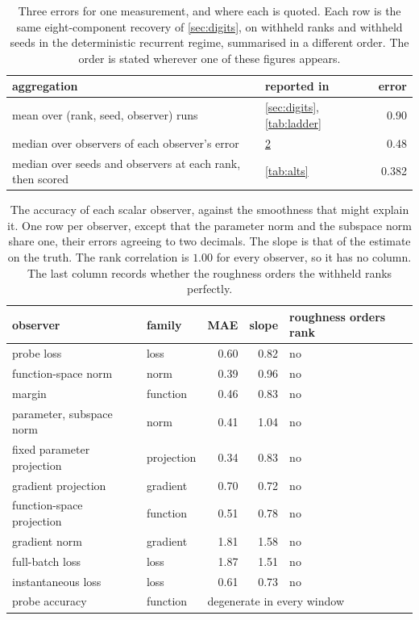 \documentclass{article}
\begin{document}
\begin{table}[H]
\centering
\caption{Three errors for one measurement, and where each is quoted. Each row is the same
eight-component recovery of \cref{sec:digits}, on withheld ranks and withheld seeds in the
deterministic recurrent regime, summarised in a different order. The order is stated wherever one
of these figures appears.}
\label{tab:aggregation}
\begin{tabular}{llr}
\toprule
aggregation & reported in & error \\
\midrule
mean over (rank, seed, observer) runs                    & \cref{sec:digits}, \cref{tab:ladder} & 0.90 \\
median over observers of each observer's error           & \cref{tab:obs}                       & 0.48 \\
median over seeds and observers at each rank, then scored & \cref{tab:alts}                      & 0.382 \\
\bottomrule
\end{tabular}
\end{table}

\begin{table}[H]
\centering
\caption{The accuracy of each scalar observer, against the smoothness that might explain it. One
row per observer, except that the parameter norm and the subspace norm share one, their errors
agreeing to two decimals. The slope is that of the estimate on the truth. The rank correlation is $1.00$ for
every observer, so it has no column. The last column records whether the roughness orders the
withheld ranks perfectly.}
\label{tab:obs}
\begin{tabular}{llrrl}
\toprule
observer & family & MAE & slope & roughness orders rank \\
\midrule
probe loss                 & loss       & 0.60 & 0.82 & no \\
function-space norm        & norm       & 0.39 & 0.96 & no \\
margin                     & function   & 0.46 & 0.83 & no \\
parameter, subspace norm   & norm       & 0.41 & 1.04 & no \\
fixed parameter projection & projection & 0.34 & 0.83 & no \\
gradient projection        & gradient   & 0.70 & 0.72 & no \\
function-space projection  & function   & 0.51 & 0.78 & no \\
gradient norm              & gradient   & 1.81 & 1.58 & no \\
full-batch loss            & loss       & 1.87 & 1.51 & no \\
\midrule
instantaneous loss         & loss       & 0.61 & 0.73 & no \\
probe accuracy             & function   & \multicolumn{3}{l}{degenerate in every window} \\
\bottomrule
\end{tabular}
\end{table}
\end{document}
